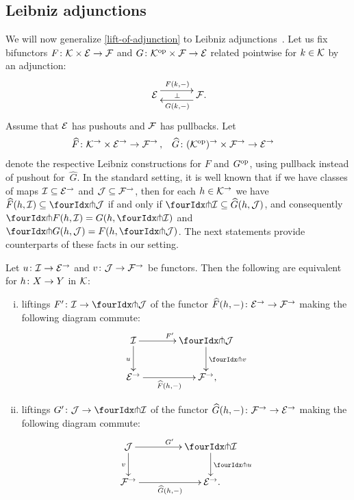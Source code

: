 \documentclass[reqno,10pt,a4paper,oneside,draft]{amsart}
\begin{document}
\subsection*{Leibniz adjunctions}

We will now generalize \cref{lift-of-adjunction} to Leibniz adjunctions~\cite{riehl-verity:reedy}.
Let us fix bifunctors $F \co \cal{K} \times \catE \to \cal{F}$ and $G \co \cal{K}^{\op} \times \cal{F} \to \catE$ related pointwise for $k \in \cal{K}$ by an adjunction:
\[
\xymatrix@C+1em{
  \catE
  \ar@<5pt>[r]^{F(k, \arghole)}
  \ar@{}[r]|{\bot}
&
  \cal{F}
  \ar@<5pt>[l]^{G(k, \arghole)}
\rlap{.}}
\]
Assume that $\catE$ has pushouts and $\cal{F}$ has pullbacks.
Let
\[
\begin{aligned}
  \widehat{F} &\co \cal{K}^\to \times \catE^\to \to \cal{F}^\to
\, ,&
  \widehat{G} &\co (\cal{K}^{\op})^\to \times \cal{F}^\to \to \catE^\to
\end{aligned}
\]
denote the respective Leibniz constructions for $F$ and $G^{\op}$, using pullback instead of pushout for~$\widehat{G}$.
In the standard setting, it is well known that if we have classes of maps $\cal{I} \subseteq \catE^\to$ and $\cal{J} \subseteq \cal{F}^\to$, then for each $h \in \cal{K}^\to$ we have $\widehat{F}(h, \cal{I}) \subseteq \liftl{\cal{J}}$ if and only if $\liftr{\cal{I}} \subseteq \widehat{G}(h, \cal{J})$, and consequently $\liftr{F(h, \cal{I})} = G(h, \liftr{\cal{I}})$ and $\liftl{G(h, \cal{J})} = F(h, \liftl{\cal{J}})$.
The next statements provide counterparts of these facts in our setting.

\begin{proposition} \label{lift-of-leibniz-adjunction}
Let $u \co \cal{I} \to \catE^\to$ and $v \co \cal{J} \to \cal{F}^\to$ be functors.
Then the following are equivalent for $h \co X \to Y$ in $\cal{K}$:
\begin{enumerate}[(i)]
\item liftings $F' \co \cal{I} \to \liftl{\cal{J}}$ of the functor $\widehat{F}(h, \arghole) \co \catE^\to \to \cal{F}^\to$ making the following diagram commute:
\[
\xymatrix@C=1.2cm{
  \cal{I}
  \ar[r]^{F'}
  \ar[d]_{u}
&
  \liftl{\cal{J}}
  \ar[d]^{\liftl{v}}
\\
  \catE^\to
  \ar[r]_-{\widehat{F}(h, \arghole)}
&
  \cal{F}^\to
\rlap{,}}
\]
\item liftings $G' \co \cal{J} \to \liftr{\cal{I}}$ of the functor $\widehat{G}(h, \arghole) \co \cal{F}^\to \to \catE^\to$ making the following diagram commute:
\[
\xymatrix@C+2em{
  \cal{J}
  \ar[d]_{v}
  \ar[r]^{G'}
&
  \liftr{\cal{I}}
  \ar[d]^{\liftr{u}}
\\
  \cal{F}^\to
  \ar[r]_-{\widehat{G}(h, \arghole)}
&
  \catE^\to
\rlap{.}}
\]
\end{enumerate}
\end{proposition}
\end{document}
